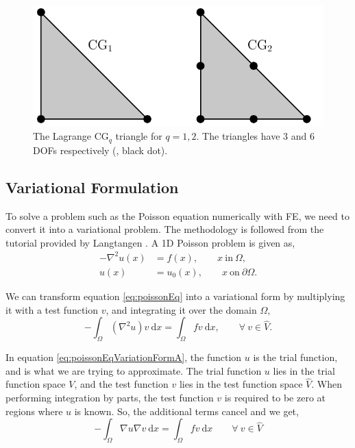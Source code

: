 	\begin{figure}[t]
	\centering
	\includegraphics[width=0.6\linewidth]{./figures/eulerian/continuousGalerkin.pdf}
	\caption{The Lagrange $\mathrm{CG}_q$ triangle for $q = 1, 2$. The triangles have $3$ and $6$ DOFs respectively ({\color{black}{$\bullet$}}, black dot).}
	\label{fig:continuousGalerkin}
	\end{figure}



\subsection*{Variational Formulation}
\label{subsec:variationalProblem}

To solve a problem such as the Poisson equation numerically with FE, we need to convert it into a variational problem. The methodology is followed from the \fenics tutorial provided by Langtangen \cite{Logg2012b}. A 1D Poisson problem is given as,
	\begin{equation}
	\begin{aligned}
	- \nabla^2 u(x) &= f(x), \qquad x\ \mathrm{in}\ \Omega,\\
	u(x) &= u_0(x), \qquad x\ \mathrm{on}\ \partial\Omega.
	\end{aligned}
	\label{eq:poissonEq}
	\end{equation}
	
We can transform equation \ref{eq:poissonEq} into a variational form by multiplying it with a test function $v$, and integrating it over the domain $\Omega$,
	\begin{equation}
	- \int_{\Omega} \left(\nabla^2 u\right)v\ \mathrm{d}x= \int_{\Omega} fv\ \mathrm{d}x, \qquad \forall\ v \in \hat{V}.
	\label{eq:poissonEqVariationFormA}
	\end{equation}

In equation \ref{eq:poissonEqVariationFormA}, the function $u$ is the trial function, and is what we are trying to approximate. The trial function $u$ lies in the trial function space $V$, and the test function $v$ lies in the test function space $\hat{V}$. When performing integration by parts, the test function $v$ is required to be zero at regions where $u$ is known. So, the additional terms cancel and we get,
	\begin{equation}
	- \int_{\Omega} \nabla u \nabla v\ \mathrm{d}x= \int_{\Omega} fv\ \mathrm{d}x \qquad \forall\ v \in \hat{V}
	\label{eq:poissonEqVariationFormB}
	\end{equation}

